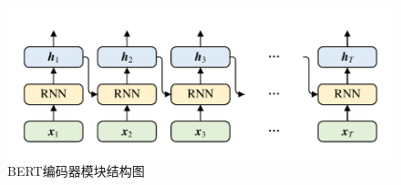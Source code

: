 \begin{figure}[htb]
	\centering
	\includegraphics[page=11, width=0.6\linewidth]{images/structure.pdf}
	\caption{BERT编码器模块结构图}
	\label{fig:BERTEncoder}
\end{figure}